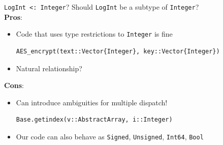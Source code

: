 \begin{frame}[fragile]{\texttt{LogInt <: Integer}?}
    Should \texttt{LogInt} be a subtype of \texttt{Integer}? \\

    \textbf{Pros}:
            \begin{itemize}
                \item Code that uses type restrictions to \texttt{Integer} is fine
\begin{verbatim}
AES_encrypt(text::Vector{Integer}, key::Vector{Integer})
\end{verbatim}
                \item Natural relationship?
            \end{itemize}
    \vspace{0.5em}

    \textbf{Cons}:
            \begin{itemize}
                \item Can introduce ambiguities for multiple dispatch! \\
                    \begin{verbatim}
Base.getindex(v::AbstractArray, i::Integer)
                    \end{verbatim}
                \item Our code can also behave as \texttt{Signed}, \texttt{Unsigned}, \texttt{Int64}, \texttt{Bool} %
            \end{itemize}

\end{frame}



